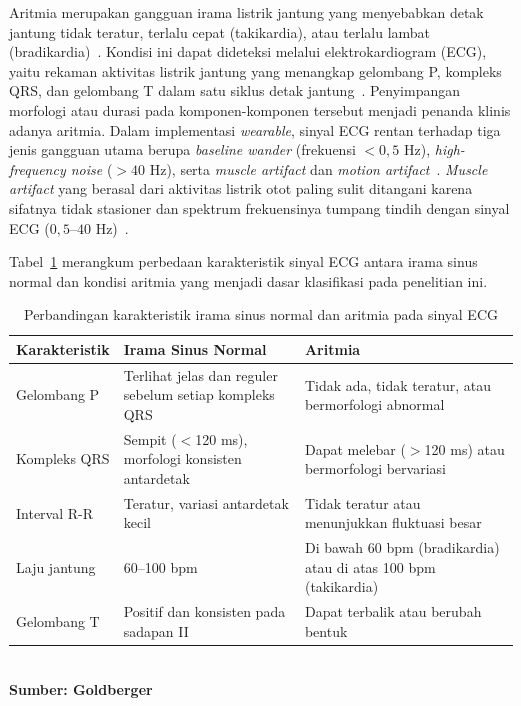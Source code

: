 Aritmia merupakan gangguan irama listrik jantung yang menyebabkan detak jantung tidak teratur, terlalu cepat (takikardia), atau terlalu lambat (bradikardia)~\cite{ecg_goldberger}. Kondisi ini dapat dideteksi melalui elektrokardiogram (ECG), yaitu rekaman aktivitas listrik jantung yang menangkap gelombang P, kompleks QRS, dan gelombang T dalam satu siklus detak jantung~\cite{ecg_goldberger}. Penyimpangan morfologi atau durasi pada komponen-komponen tersebut menjadi penanda klinis adanya aritmia. Dalam implementasi \textit{wearable}, sinyal ECG rentan terhadap tiga jenis gangguan utama berupa \textit{baseline wander} (frekuensi $< 0{,}5$ Hz), \textit{high-frequency noise} ($> 40$ Hz), serta \textit{muscle artifact} dan \textit{motion artifact}~\cite{zambrano_2026, jia_2024}. \textit{Muscle artifact} yang berasal dari aktivitas listrik otot paling sulit ditangani karena sifatnya tidak stasioner dan spektrum frekuensinya tumpang tindih dengan sinyal ECG ($0{,}5$--$40$ Hz)~\cite{jia_2024}.

Tabel~\ref{tab:perbandingan-irama} merangkum perbedaan karakteristik
sinyal ECG antara irama sinus normal dan kondisi aritmia yang menjadi
dasar klasifikasi pada penelitian ini.

\begin{table}[!ht]
  \centering
  \caption{Perbandingan karakteristik irama sinus normal dan aritmia
           pada sinyal ECG}
  \label{tab:perbandingan-irama}
  \small
  \begin{tabular}{p{3.0cm}p{4.5cm}p{4.5cm}}
    \toprule
    \textbf{Karakteristik} &
    \textbf{Irama Sinus Normal} &
    \textbf{Aritmia} \\
    \midrule
    Gelombang P &
    Terlihat jelas dan reguler sebelum setiap kompleks QRS &
    Tidak ada, tidak teratur, atau bermorfologi abnormal \\
    Kompleks QRS &
    Sempit ($<$120 ms), morfologi konsisten antardetak &
    Dapat melebar ($>$120 ms) atau bermorfologi bervariasi \\
    Interval R-R &
    Teratur, variasi antardetak kecil &
    Tidak teratur atau menunjukkan fluktuasi besar \\
    Laju jantung &
    60--100 bpm &
    Di bawah 60 bpm (bradikardia) atau di atas 100 bpm (takikardia) \\
    Gelombang T &
    Positif dan konsisten pada sadapan II &
    Dapat terbalik atau berubah bentuk \\
    \bottomrule
  \end{tabular}
  \smallskip\\
  \small\textbf{Sumber: Goldberger~\cite{ecg_goldberger}}
\end{table}

